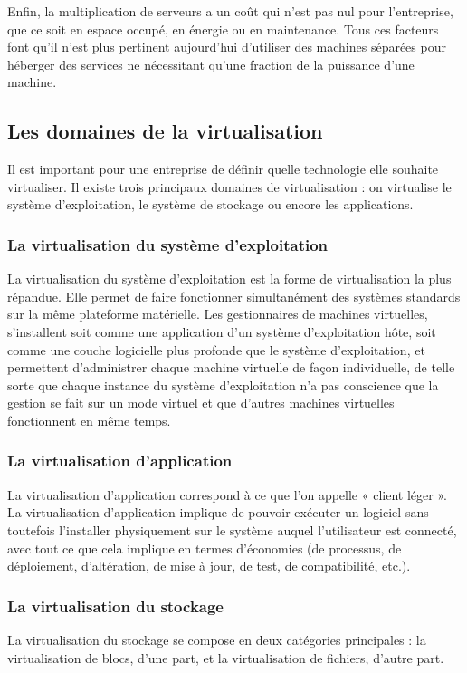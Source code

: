 \documentclass[a4paper,12pt]{report}
\begin{document}
\begin{onehalfspace}
	Enfin, la multiplication de serveurs a un coût qui n’est pas nul pour l’entreprise, que ce soit en espace occupé, en énergie ou en maintenance. Tous ces facteurs font qu’il n’est plus pertinent aujourd’hui d’utiliser des machines séparées pour héberger des services ne nécessitant qu’une 
fraction de la puissance d’une machine.
	
	\subsection{Les domaines de la virtualisation}
	Il est important pour une entreprise de définir quelle technologie elle souhaite virtualiser. Il existe trois principaux domaines de virtualisation : on virtualise le système d'exploitation, le système de stockage ou encore les applications.
	
	\subsubsection{La virtualisation du système d'exploitation}
	La virtualisation du système d'exploitation est la forme de virtualisation la plus répandue. Elle permet de faire fonctionner simultanément des systèmes standards sur la même plateforme matérielle. Les gestionnaires de machines virtuelles, s'installent soit comme une application d'un système d'exploitation hôte, soit comme une couche logicielle plus profonde que le système d'exploitation, et permettent d'administrer chaque machine virtuelle de façon individuelle, de telle sorte que chaque instance du système d'exploitation n'a pas conscience que la gestion se fait sur un mode virtuel et que d'autres machines virtuelles fonctionnent en même temps.
	
	\subsubsection{La virtualisation d'application}
	La virtualisation d'application correspond à ce que l'on appelle « client léger ». La virtualisation d'application implique de pouvoir exécuter un logiciel sans toutefois l'installer physiquement sur le système auquel l'utilisateur est connecté, avec tout ce que cela implique en termes d'économies (de processus, de déploiement, d'altération, de mise à jour, de test, de compatibilité, etc.).  
	
	\subsubsection{La virtualisation du stockage}
	La virtualisation du stockage se compose en deux catégories principales : la virtualisation de blocs, d'une part, et la virtualisation de fichiers, d'autre part. 
	

\end{onehalfspace}
\end{document}
